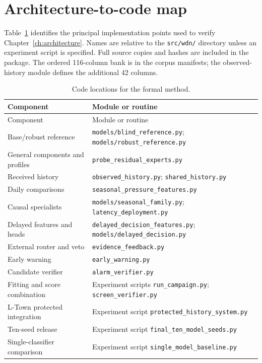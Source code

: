 \section{Architecture-to-code map}
Table~\ref{tab:codemap} identifies the principal implementation points used to verify Chapter~\ref{ch:architecture}. Names are relative to the \texttt{src/wdn/} directory unless an experiment script is specified. Full source copies and hashes are included in the package. The ordered 116-column bank is in the corpus manifests; the observed-history module defines the additional 42 columns.

\begin{longtable}{@{}>{\raggedright\arraybackslash}p{.35\linewidth}>{\raggedright\arraybackslash}p{.60\linewidth}@{}}
\caption[Architecture implementation map]{Code locations for the formal method.}\label{tab:codemap}\\
\toprule Component & Module or routine\\\midrule\endfirsthead
\toprule Component & Module or routine\\\midrule\endhead
Base/robust reference & \texttt{models/blind\_reference.py}; \texttt{models/robust\_reference.py}\\
General components and profiles & \texttt{probe\_residual\_experts.py}\\
Received history & \texttt{observed\_history.py}; \texttt{shared\_history.py}\\
Daily comparisons & \texttt{seasonal\_pressure\_features.py}\\
Causal specialists & \texttt{models/seasonal\_family.py}; \texttt{latency\_deployment.py}\\
Delayed features and heads & \texttt{delayed\_decision\_features.py}; \texttt{models/delayed\_decision.py}\\
External router and veto & \texttt{evidence\_feedback.py}\\
Early warning & \texttt{early\_warning.py}\\
Candidate verifier & \texttt{alarm\_verifier.py}\\
Fitting and score combination & Experiment scripts \texttt{run\_campaign.py}; \texttt{screen\_verifier.py}\\
L-Town protected integration & Experiment script \texttt{protected\_history\_system.py}\\
Ten-seed release & Experiment script \texttt{final\_ten\_model\_seeds.py}\\
Single-classifier comparison & Experiment script \texttt{single\_model\_baseline.py}\\
\bottomrule\end{longtable}

